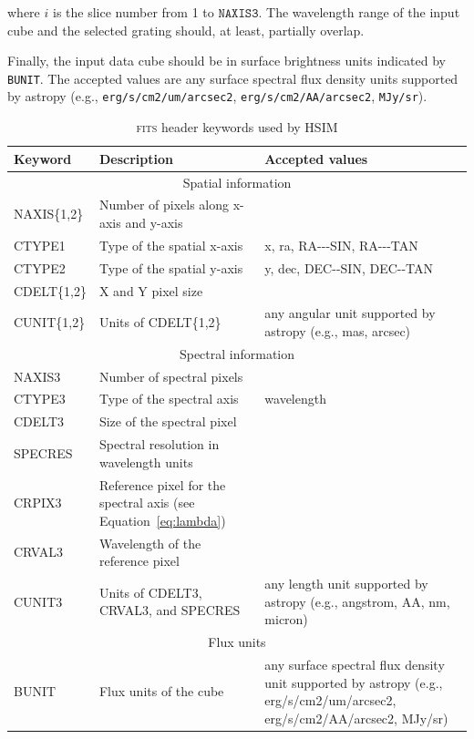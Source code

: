 \documentclass[12pt]{report}
\begin{document}
where $i$ is the slice number from 1 to $\texttt{NAXIS3}$. The wavelength range of the input cube and the selected grating should, at least, partially overlap.

Finally, the input data cube should be in surface brightness units indicated by \texttt{BUNIT}. The accepted values are any surface spectral flux density units supported by astropy (e.g., \texttt{erg/s/cm2/um/arcsec2}, \texttt{erg/s/cm2/AA/arcsec2}, \texttt{MJy/sr}).


\begin{table}[h]
\footnotesize
\centering
\caption{\textsc{fits} header keywords used by HSIM}
\label{tab:fits_header}
\begin{tabular}{lp{75mm}p{50mm}}
\hline
Keyword & Description & Accepted values \\
\hline
\multicolumn{3}{c}{Spatial information}\\
\hline
NAXIS\{1,2\} & Number of pixels along x-axis and y-axis\\
CTYPE1 & Type of the spatial x-axis & x, ra, RA-{}-{}-SIN, RA-{}-{}-TAN \\
CTYPE2 & Type of the spatial y-axis & y, dec, DEC-{}-SIN, DEC-{}-TAN \\
CDELT\{1,2\} & X and Y pixel size \\
CUNIT\{1,2\} & Units of CDELT\{1,2\} & any angular unit supported by astropy (e.g., mas, arcsec)\\
\hline
\multicolumn{3}{c}{Spectral information}\\
\hline
NAXIS3 & Number of spectral pixels \\
CTYPE3 & Type of the spectral axis & wavelength \\
CDELT3 & Size of the spectral pixel \\
SPECRES & Spectral resolution in wavelength units &  \\
CRPIX3 & Reference pixel for the spectral axis (see Equation~\ref{eq:lambda}) \\
CRVAL3 & Wavelength of the reference pixel\\
CUNIT3 & Units of CDELT3, CRVAL3, and SPECRES & any length unit supported by astropy (e.g., angstrom, AA, nm, micron) \\
\hline
\multicolumn{3}{c}{Flux units}\\
\hline
BUNIT & Flux units of the cube & any surface spectral flux density unit supported by astropy (e.g., erg/s/cm2/um/arcsec2, erg/s/cm2/AA/arcsec2, MJy/sr) \\
\hline
\end{tabular}
\end{table}
\end{document}
